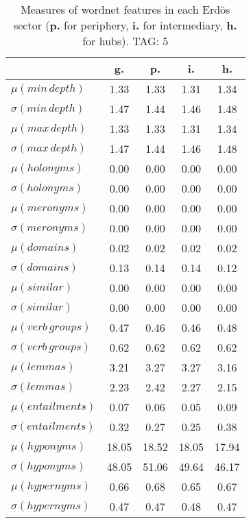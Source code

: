 \begin{table}[h!]
\begin{center}
\begin{tabular}{| l | c | c | c | c |}\hline
 & g. & p. & i. & h. \\\hline
$\mu(min\,depth)$ & 1.33  & 1.33  & 1.31  & 1.34 \\\hline
$\sigma(min\,depth)$ & 1.47  & 1.44  & 1.46  & 1.48 \\\hline
$\mu(max\,depth)$ & 1.33  & 1.33  & 1.31  & 1.34 \\\hline
$\sigma(max\,depth)$ & 1.47  & 1.44  & 1.46  & 1.48 \\\hline
$\mu(holonyms)$ & 0.00  & 0.00  & 0.00  & 0.00 \\\hline
$\sigma(holonyms)$ & 0.00  & 0.00  & 0.00  & 0.00 \\\hline
$\mu(meronyms)$ & 0.00  & 0.00  & 0.00  & 0.00 \\\hline
$\sigma(meronyms)$ & 0.00  & 0.00  & 0.00  & 0.00 \\\hline
$\mu(domains)$ & 0.02  & 0.02  & 0.02  & 0.02 \\\hline
$\sigma(domains)$ & 0.13  & 0.14  & 0.14  & 0.12 \\\hline
$\mu(similar)$ & 0.00  & 0.00  & 0.00  & 0.00 \\\hline
$\sigma(similar)$ & 0.00  & 0.00  & 0.00  & 0.00 \\\hline
$\mu(verb\,groups)$ & 0.47  & 0.46  & 0.46  & 0.48 \\\hline
$\sigma(verb\,groups)$ & 0.62  & 0.62  & 0.62  & 0.62 \\\hline
$\mu(lemmas)$ & 3.21  & 3.27  & 3.27  & 3.16 \\\hline
$\sigma(lemmas)$ & 2.23  & 2.42  & 2.27  & 2.15 \\\hline
$\mu(entailments)$ & 0.07  & 0.06  & 0.05  & 0.09 \\\hline
$\sigma(entailments)$ & 0.32  & 0.27  & 0.25  & 0.38 \\\hline
$\mu(hyponyms)$ & 18.05  & 18.52  & 18.05  & 17.94 \\\hline
$\sigma(hyponyms)$ & 48.05  & 51.06  & 49.64  & 46.17 \\\hline
$\mu(hypernyms)$ & 0.66  & 0.68  & 0.65  & 0.67 \\\hline
$\sigma(hypernyms)$ & 0.47  & 0.47  & 0.48  & 0.47 \\\hline
\end{tabular}
\caption{Measures of wordnet features in each Erd\"os sector ({{\bf p.}} for periphery, {{\bf i.}} for intermediary, {{\bf h.}} for hubs). TAG: 5}
\end{center}
\end{table}